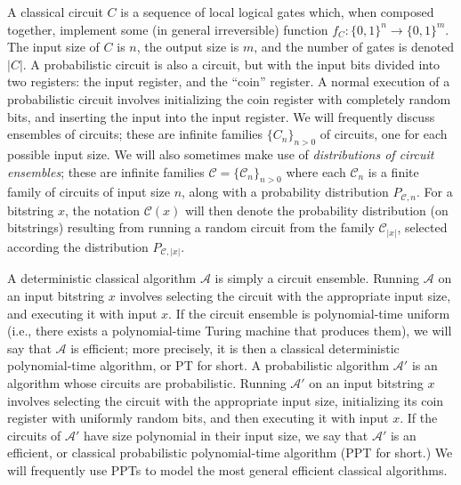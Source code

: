 \documentclass[11pt]{article}
\numberwithin{equation}{section}
\newcommand{\algo}{\mathcal}
\begin{document}
{A classical circuit $C$ is a sequence of local logical gates which, when composed together, implement some (in general irreversible) function $f_C: \{0, 1\}^n \rightarrow \{0, 1\}^m$. The input size of $C$ is $n$, the output size is $m$, and the number of gates is denoted $|C|$. A probabilistic circuit is also a circuit, but with the input bits divided into two registers: the input register, and the ``coin'' register. A normal execution of a probabilistic circuit involves initializing the coin register with completely random bits, and inserting the input into the input register. We will frequently discuss ensembles of circuits; these are infinite families $\{C_n\}_{n > 0}$ of circuits, one for each possible input size. We will also sometimes make use of \emph{distributions of circuit ensembles}; these are infinite families $\mathcal C = \{\mathcal C_n\}_{n > 0}$ where each $\mathcal C_n$ is a finite family of circuits of input size $n$, along with a probability distribution $P_{\mathcal C, n}$. For a bitstring $x$, the notation $\mathcal C(x)$ will then denote the probability distribution (on bitstrings) resulting from running a random circuit from the family $\mathcal C_{|x|}$, selected according the distribution $P_{\mathcal C, |x|}$.

A deterministic classical algorithm $\algo A$ is simply a circuit ensemble. Running $\algo A$ on an input bitstring $x$ involves selecting the circuit with the appropriate input size, and executing it with input $x$. If the circuit ensemble is polynomial-time uniform (i.e., there exists a polynomial-time Turing machine that produces them), we will say that $\algo A$ is efficient; more precisely, it is then a classical deterministic polynomial-time algorithm, or PT for short. A probabilistic algorithm $\algo A'$ is an algorithm whose circuits are probabilistic. Running $\algo A'$ on an input bitstring $x$ involves selecting the circuit with the appropriate input size, initializing its coin register with uniformly random bits, and then executing it with input $x$. If the circuits of $\algo A'$ have size polynomial in their input size, we say that $\algo A'$ is an efficient, or classical probabilistic polynomial-time algorithm (PPT for short.) We will frequently use PPTs to model the most general efficient classical algorithms.

}
\end{document}
